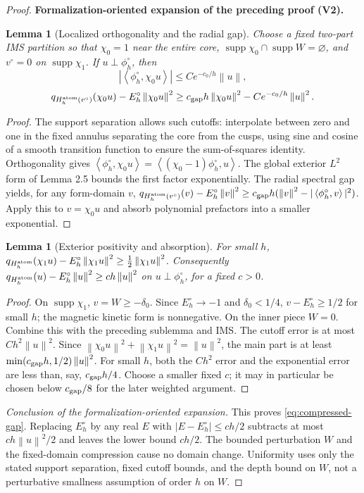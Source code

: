 \documentclass[11pt]{article}
\newtheorem{lemma}[theorem]{Lemma}
\newcommand{\formalisationparentid}{X}
\newenvironment{formalisationaddition}[1]{\par\medskip\begingroup\color{blue}\def\formalisationparentid{#1}\setcounter{formalizationsublemma}{0}\let\lemma\formalizationsublemma\let\endlemma\endformalizationsublemma
  \def\Eo{\mathcal E_h^\circ}\def\EE{\mathcal E_h}\def\phio{\phi_h^\circ}\def\phih{\phi_h}\def\Ho{H_h^{\rm atom}(v^\circ)}\def\Ha{H_h^{\rm atom}}\def\HL{H_h^{L}}\def\Dh{D_h}\def\Log{\operatorname{Log}}\def\ellh{\ell_h}\def\Gp{G_{p,h}}\def\Ast{A_{*,h}}\def\ahat{\widehat{\mathfrak a}_h}\def\ah{\mathfrak a_h}\def\rh{\widehat\rho_h}\def\deltah{\widehat\delta_h}\def\oldref##1{\textup{(##1)}}\def\interface##1{\par\noindent\textit{Analytical interface used here.} ##1\par}\def\finish{\par\noindent\textit{Conclusion of the formalization-oriented expansion.} }\par\noindent\textbf{Formalization-oriented expansion of the preceding proof (V2).}\par\smallskip
}{\par\endgroup\medskip
}
\newcommand{\norm}[1]{\left\|#1\right\|}
\newcommand{\ip}[2]{\left\langle #1,#2\right\rangle}
\newcommand{\supp}{\operatorname{supp}}
\begin{document}
\begin{proof}
\begin{formalisationaddition}{L3.1}
\begin{lemma}[Localized orthogonality and the radial gap]\label{sublemma:L3-1-local-orthogonality}
Choose a fixed two-part IMS partition so that $\chi_0=1$ near the entire core, $\supp\chi_0\cap\supp W=\varnothing$, and $v^\circ=0$ on $\supp\chi_1$. If $u\perp\phio$, then
\[
 |\ip{\phio}{\chi_0u}|\le C e^{-c_0/h}\norm u,
\]
\[
 q_{\Ho}(\chi_0u)-E_h^\circ\norm{\chi_0u}^2
 \ge c_{\rm gap}h\norm{\chi_0u}^2-Ce^{-c_0/h}\norm u^2.
\]
\end{lemma}
\begin{proof}
The support separation allows such cutoffs: interpolate between zero and one in the fixed annulus separating the core from the cusps, using sine and cosine of a smooth transition function to ensure the sum-of-squares identity. Orthogonality gives
$\ip{\phio}{\chi_0u}=\ip{(\chi_0-1)\phio}{u}$.
The global exterior $L^2$ form of Lemma 2.5 bounds the first factor exponentially. The radial spectral gap yields, for any form-domain $v$,
$q_{\Ho}(v)-E_h^\circ\norm v^2\ge c_{\rm gap}h(\norm v^2-|\ip{\phio}{v}|^2)$. Apply this to $v=\chi_0u$ and absorb polynomial prefactors into a smaller exponential.
\end{proof}

\begin{lemma}[Exterior positivity and absorption]\label{sublemma:L3-1-exterior}
For small $h$,
$q_{\Ha}(\chi_1u)-E_h^\circ\norm{\chi_1u}^2\ge\frac12\norm{\chi_1u}^2$.
Consequently $q_{\Ha}(u)-E_h^\circ\norm u^2\ge c h\norm u^2$ on $u\perp\phio$, for a fixed $c>0$.
\end{lemma}
\begin{proof}
On $\supp\chi_1$, $v=W\ge-\delta_0$. Since $E_h^\circ\to-1$ and $\delta_0<1/4$, $v-E_h^\circ\ge1/2$ for small $h$; the magnetic kinetic form is nonnegative. On the inner piece $W=0$. Combine this with the preceding sublemma and IMS. The cutoff error is at most $Ch^2\norm u^2$. Since $\norm{\chi_0u}^2+\norm{\chi_1u}^2=\norm u^2$, the main part is at least $\min(c_{\rm gap}h,1/2)\norm u^2$. For small $h$, both the $Ch^2$ error and the exponential error are less than, say, $c_{\rm gap}h/4$. Choose a smaller fixed $c$; it may in particular be chosen below $c_{\rm gap}/8$ for the later weighted argument.
\end{proof}
\finish This proves \eqref{eq:compressed-gap}. Replacing $E_h^\circ$ by any real $E$ with $|E-E_h^\circ|\le ch/2$ subtracts at most $ch\norm u^2/2$ and leaves the lower bound $ch/2$. The bounded perturbation $W$ and the fixed-domain compression cause no domain change. Uniformity uses only the stated support separation, fixed cutoff bounds, and the depth bound on $W$, not a perturbative smallness assumption of order $h$ on $W$.
\end{formalisationaddition}

\end{proof}
\end{document}
